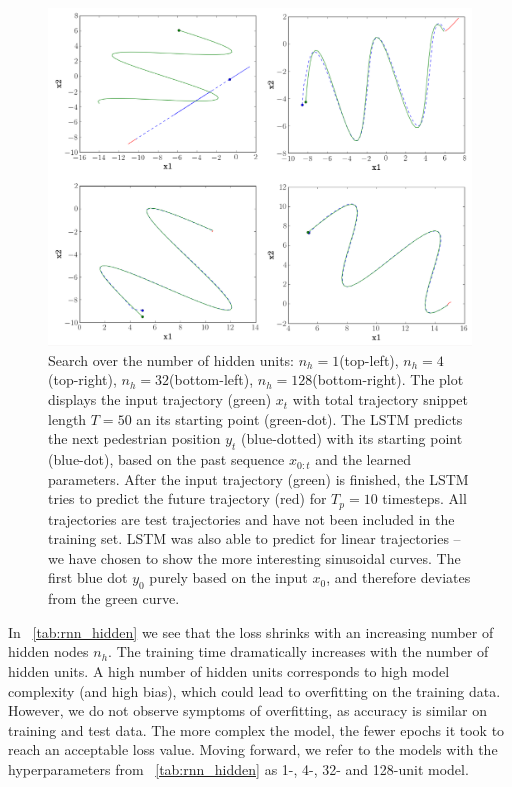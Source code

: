 \begin{figure}
	\centering
	\includegraphics [trim=0 0 0 0, clip, angle=0, width=1.0\columnwidth,
	keepaspectratio]{figures/rnn_hidden}
	\caption{Search over the number of hidden units: $n_h=1$(top-left), $n_h=4$(top-right), $n_h=32$(bottom-left), $n_h=128$(bottom-right). The plot displays the input trajectory (green) $x_t$ with total trajectory snippet length $T=50$ an its starting point (green-dot). The LSTM predicts the next pedestrian position $y_t$ (blue-dotted) with its starting point (blue-dot), based on the past sequence $x_{0:t}$ and the learned parameters. After the input trajectory (green) is finished, the LSTM tries to predict the future trajectory (red) for $T_p=10$ timesteps. All trajectories are test trajectories and have not been included in the training set. LSTM was also able to predict for linear trajectories -- we have chosen to show the more interesting sinusoidal curves. The first blue dot $y_0$ purely based on the input $x_0$, and therefore deviates from the green curve.}
	\label{fig:rnn_hidden}
\end{figure}

In ~\cref{tab:rnn_hidden} we see that the loss shrinks with an increasing number of hidden nodes $n_h$.
The training time dramatically increases with the number of hidden units.
A high number of hidden units corresponds to high model complexity (and high bias), which could lead to overfitting on the training data.
However, we do not observe symptoms of overfitting, as accuracy is similar on training and test data.
The more complex the model, the fewer epochs it took to reach an acceptable loss value.
Moving forward, we refer to the models with the hyperparameters from ~\cref{tab:rnn_hidden} as 1-, 4-, 32- and 128-unit model.

